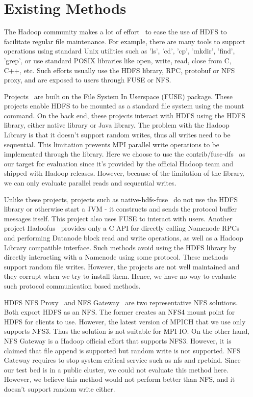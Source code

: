 \section{Existing Methods}
\label{sec:bg}
The Hadoop community makes a lot of effort~\cite{fuse} to ease the use of HDFS to
facilitate regular file maintenance. For example, there are many tools to support
operations using standard Unix
utilities such as 'ls', 'cd', 'cp', 'mkdir', 'find', 'grep', or use standard
POSIX libraries like open, write, read, close from C, C++, etc. Such efforts
usually use the HDFS library, RPC, protobuf or NFS proxy, and are exposed to users
through FUSE or NFS.

Projects~\cite{fuse, hdfs-fuse, fuse-j} are built on the File System In Userspace (FUSE) package. These projects enable
HDFS to be mounted as a standard file system using the mount command. On the
back end, these projects interact with HDFS using the HDFS library, either native
library or Java library. The problem with the Hadoop Library is that it doesn't
support random writes, thus all writes need to be sequential. This limitation
prevents MPI parallel write operations to be implemented through the library.
Here we choose
to use the contrib/fuse-dfs~\cite{fuse} as our target for evaluation since it's
provided by the official Hadoop team and shipped with Hadoop releases. However,
because of the limitation of the library, we can only evaluate parallel reads and
sequential writes.

Unlike
these projects, projects such as native-hdfs-fuse~\cite{native} do not use the
HDFS library or otherwise start a JVM - it constructs and sends the protocol buffer
messages itself. This project also uses FUSE to interact with users. Another
project Hadoofus~\cite{hadoofus} provides only a C
API for directly calling Namenode RPCs and performing Datanode block read and
write operations, as well as a Hadoop Library compatible interface. Such methods
avoid using the HDFS library by directly interacting with a Namenode using some
protocol. These methods support random file writes. However, the projects are
not well maintained and they corrupt when we try to install them. Hence, we have
no way to evaluate such protocol communication based methods.

HDFS NFS Proxy~\cite{proxy} and NFS Gateway~\cite{nfs} are two representative
NFS solutions. Both export HDFS as an NFS. The former creates an NFS4 mount point
for HDFS for clients to use. However, the latest version of MPICH that
we use only supports NFS3. Thus the solution is not suitable for MPI-IO. On the
other hand, NFS Gateway is a Hadoop official effort that supports NFS3. However,
it is claimed that file append is supported but random write is not supported.
NFS Gateway requires to stop system
critical service such as nfs and rpcbind. Since our test bed is in a public
cluster, we could not evaluate this method here. However, we believe this method would
not perform better than NFS, and it doesn't support random write either.


